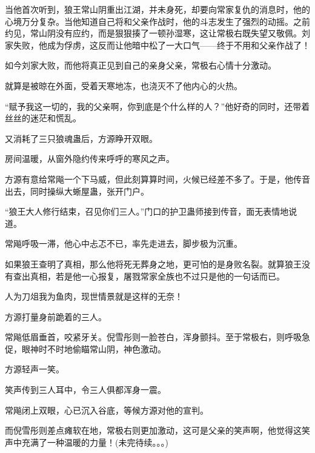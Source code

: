 \begin{this_body}
当他首次听到，狼王常山阴重出江湖，并未身死，却要向常家复仇的消息时，他的心境万分复杂。当他知道自己将和父亲作战时，他的斗志发生了强烈的动摇。之前约见，常山阴没有应约，而是狠狠揍了一顿孙湿寒，这让常极右既失望又敬佩。刘家失败，他成为俘虏，这反而让他暗中松了一大口气——终于不用和父亲作战了！

如今刘家大败，而他将真正见到自己的亲身父亲，常极右心情十分激动。

就算是被晾在外面，受着天寒地冻，也浇灭不了他内心的火热。

“赋予我这一切的，我的父亲啊，你到底是个什么样的人？”他好奇的同时，还带着丝丝的迷茫和慌乱。

又消耗了三只狼魂蛊后，方源睁开双眼。

房间温暖，从窗外隐约传来呼呼的寒风之声。

方源有意给常飚一个下马威，但此刻算算时间，火候已经差不多了。于是，他传音出去，同时操纵大蜥屋蛊，张开门户。

“狼王大人修行结束，召见你们三人。”门口的护卫蛊师接到传音，面无表情地说道。

常飚呼吸一滞，他心中忐忑不已，率先走进去，脚步极为沉重。

如果狼王查明了真相，那么他将死无葬身之地，更可怕的是身败名裂。就算狼王没有查出真相，若是他一心报复，屠戮常家全族也不过只是他的一句话而已。

人为刀俎我为鱼肉，现世情景就是这样的无奈！

方源打量身前跪着的三人。

常飚低眉垂首，咬紧牙关。倪雪彤则一脸苍白，浑身颤抖。至于常极右，则呼吸急促，眼神时不时地偷瞄常山阴，神色激动。

方源轻声一笑。

笑声传到三人耳中，令三人俱都浑身一震。

常飚闭上双眼，心已沉入谷底，等候方源对他的宣判。

而倪雪彤则差点瘫软在地，常极右则更加激动，这可是父亲的笑声啊，他觉得这笑声中充满了一种温暖的力量！(未完待续。。。)

\end{this_body}

